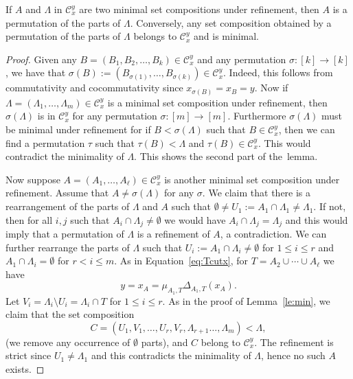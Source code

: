 \documentclass[ALCO,ThmDefs,Unicode,epreuves]{cedram}
\begin{document}
\begin{lemma}\label{lem:minimalcom}
 If $A$ and $\Lambda$ in $ \mathcal{C}_{x}^{y}$ are two minimal set compositions under refinement, then $A$ is a permutation of the parts of $\Lambda$.
 Conversely, any set composition obtained by a permutation of the parts of $\Lambda$ belongs to $\mathcal{C}_{x}^{y}$ and is minimal.
\end{lemma}
\begin{proof}
Given any $B=(B_1,B_2,\ldots, B_k)\in \mathcal{C}_{x}^{y}$ and any permutation $\sigma\colon[k]\to[k]$, we have that $\sigma(B):=(B_{\sigma(1)},\ldots,B_{\sigma(k)})\in \mathcal{C}_{x}^{y}$.
Indeed, this follows from commutativity and cocommutativity since $x_{\sigma(B)}=x_B=y$. Now if $\Lambda=(\Lambda_1,\ldots,\Lambda_m)\in \mathcal{C}_{x}^{y}$ is a minimal set composition under refinement, then $\sigma(\Lambda)$ is in $\mathcal{C}_{x}^{y}$ for any permutation $\sigma\colon[m]\to[m]$. Furthermore $\sigma(\Lambda)$ must be minimal under refinement for if $B<\sigma(\Lambda)$ such that $B\in \mathcal{C}_{x}^{y}$, then we can find a permutation $\tau$ such that $\tau(B)<\Lambda$ and $\tau(B)\in \mathcal{C}_{x}^{y}$. This would contradict the minimality of $\Lambda$.
This shows the second part of the~lemma.

Now suppose $A=(A_1,\ldots,A_\ell)\in \mathcal{C}_{x}^{y}$ is another minimal set composition under refinement. Assume that $A\ne\sigma(\Lambda)$ for any $\sigma$. 
We claim that there is a rearrangement of the parts of $\Lambda$ and $A$ such that $\emptyset\ne U_1:= A_1\cap \Lambda_1\ne \Lambda_1$. 
If not, then for all $i,j$ such that $A_i\cap\Lambda_j\ne\emptyset$ we would have $A_i\cap\Lambda_j=\Lambda_j$ and this would imply that a permutation of $\Lambda$ is a refinement of $A$, a contradiction. 
We can further rearrange the parts of $\Lambda$ such that $U_i:=A_1\cap \Lambda_i\ne\emptyset$ for $1\le i\le r$ and $A_1\cap \Lambda_i=\emptyset$ for $r<i\le m$.
As in Equation~\eqref{eq:Tcutx}, for $T=A_2\cup\cdots\cup A_\ell$ we have
\begin{equation} \label{eq:Mincutx}
 y=x_A=\mu_{A_1,T}\Delta_{A_1,T}(x_A).
 \end{equation}
Let $V_i=\Lambda_i\setminus U_i=\Lambda_i\cap T$ for $1\le i\le r$.
As in the proof of Lemma~\ref{le:min}, we claim that the set composition 
 $$C=(U_1,V_1,\ldots,U_r,V_r,\Lambda_{r+1}\ldots,\Lambda_m)<\Lambda,$$
(we remove any occurrence of $\emptyset$ parts), and $C$ belong to $\mathcal{C}_{x}^{y}$. The refinement is strict since $U_1\ne\Lambda_1$ and this contradicts the minimality of $\Lambda$, hence no such $A$ exists.


\end{proof}
\end{document}
